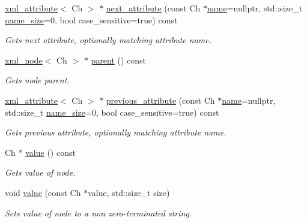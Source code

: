 \begin{DoxyCompactItemize}
\mbox{\hyperlink{classrapidxml_1_1xml__attribute}{xml\+\_\+attribute}}$<$ Ch $>$ $\ast$ \mbox{\hyperlink{classrapidxml_1_1xml__attribute_a7393ae5940d5766aa90dc9f8f92465df}{next\+\_\+attribute}} (const Ch $\ast$\mbox{\hyperlink{classrapidxml_1_1xml__base_af8436e9ee14c127220113eaa956eafee}{name}}=nullptr, std\+::size\+\_\+t \mbox{\hyperlink{classrapidxml_1_1xml__base_ad01e2eff02202b130baad012d1ed7328}{name\+\_\+size}}=0, bool case\+\_\+sensitive=true) const
\begin{DoxyCompactList}\small\item\em Gets next attribute, optionally matching attribute name. \end{DoxyCompactList}\item 
\mbox{\hyperlink{classrapidxml_1_1xml__node}{xml\+\_\+node}}$<$ Ch $>$ $\ast$ \mbox{\hyperlink{classrapidxml_1_1xml__base_a7f177e162f72f65ea1f0f0188e41c1ba}{parent}} () const
\begin{DoxyCompactList}\small\item\em Gets node parent. \end{DoxyCompactList}\item 
\mbox{\hyperlink{classrapidxml_1_1xml__attribute}{xml\+\_\+attribute}}$<$ Ch $>$ $\ast$ \mbox{\hyperlink{classrapidxml_1_1xml__attribute_a5c0f7ce2551a3620ba465923206b398c}{previous\+\_\+attribute}} (const Ch $\ast$\mbox{\hyperlink{classrapidxml_1_1xml__base_af8436e9ee14c127220113eaa956eafee}{name}}=nullptr, std\+::size\+\_\+t \mbox{\hyperlink{classrapidxml_1_1xml__base_ad01e2eff02202b130baad012d1ed7328}{name\+\_\+size}}=0, bool case\+\_\+sensitive=true) const
\begin{DoxyCompactList}\small\item\em Gets previous attribute, optionally matching attribute name. \end{DoxyCompactList}\item 
Ch $\ast$ \mbox{\hyperlink{classrapidxml_1_1xml__base_a558b1045e6751e4024309d41bf35c542}{value}} () const
\begin{DoxyCompactList}\small\item\em Gets value of node. \end{DoxyCompactList}\item 
void \mbox{\hyperlink{classrapidxml_1_1xml__base_ad9640aa3f5374673cb72a5289b6c91eb}{value}} (const Ch $\ast$value, std\+::size\+\_\+t size)
\begin{DoxyCompactList}\small\item\em Sets value of node to a non zero-\/terminated string. \end{DoxyCompactList}\item 

\end{DoxyCompactItemize}
